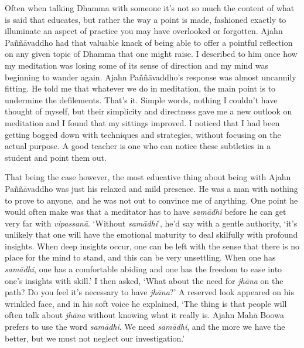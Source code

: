 Often when talking Dhamma with someone it's not so much the content of
what is said that educates, but rather the way a point is made,
fashioned exactly to illuminate an aspect of practice you may have
overlooked or forgotten. Ajahn Paññāvaddho had that valuable knack of
being able to offer a pointful reflection on any given topic of Dhamma
that one might raise. I described to him once how my meditation was
losing some of its sense of direction and my mind was beginning to
wander again. Ajahn Paññāvaddho's response was almost uncannily fitting.
He told me that whatever we do in meditation, the main point is to
undermine the defilements. That's it. Simple words, nothing I couldn't
have thought of myself, but their simplicity and directness gave me a
new outlook on meditation and I found that my sittings improved. I
noticed that I had been getting bogged down with techniques and
strategies, without focusing on the actual purpose. A good teacher is
one who can notice these subtleties in a student and point them out.

That being the case however, the most educative thing about being with
Ajahn Paññāvaddho was just his relaxed and mild presence. He was a man
with nothing to prove to anyone, and he was not out to convince me of
anything. One point he would often make was that a meditator has to have
\emph{samādhi} before he can get very far with \emph{vipassanā}.
`Without \emph{samādhi}', he'd say with a gentle authority, `it's
unlikely that one will have the emotional maturity to deal skilfully
with profound insights. When deep insights occur, one can be left with
the sense that there is no place for the mind to stand, and this can be
very unsettling. When one has \emph{samādhi}, one has a comfortable
abiding and one has the freedom to ease into one's insights with skill.'
I then asked, `What about the need for \emph{jhāna} on the path? Do you
feel it's necessary to have \emph{jhāna}?' A reserved look appeared on
his wrinkled face, and in his soft voice he explained, `The thing is
that people will often talk about \emph{jhāna} without knowing what it
really is. Ajahn Mahā Boowa prefers to use the word \emph{samādhi}. We
need \emph{samādhi}, and the more we have the better, but we must not
neglect our investigation.'

